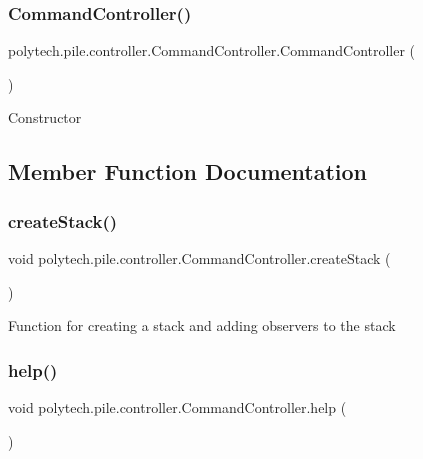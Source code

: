 \subsubsection{\texorpdfstring{Command\+Controller()}{CommandController()}}
{\footnotesize\ttfamily polytech.\+pile.\+controller.\+Command\+Controller.\+Command\+Controller (\begin{DoxyParamCaption}{ }\end{DoxyParamCaption})}

Constructor 

\subsection{Member Function Documentation}
\hypertarget{classpolytech_1_1pile_1_1controller_1_1_command_controller_a8325e47840b45543564efa453d77d4b0}{}\label{classpolytech_1_1pile_1_1controller_1_1_command_controller_a8325e47840b45543564efa453d77d4b0} 
\subsubsection{\texorpdfstring{create\+Stack()}{createStack()}}
{\footnotesize\ttfamily void polytech.\+pile.\+controller.\+Command\+Controller.\+create\+Stack (\begin{DoxyParamCaption}{ }\end{DoxyParamCaption})}

Function for creating a stack and adding observers to the stack \hypertarget{classpolytech_1_1pile_1_1controller_1_1_command_controller_adfc3719a4a015a6d19debda1db443d46}{}\label{classpolytech_1_1pile_1_1controller_1_1_command_controller_adfc3719a4a015a6d19debda1db443d46} 
\subsubsection{\texorpdfstring{help()}{help()}}
{\footnotesize\ttfamily void polytech.\+pile.\+controller.\+Command\+Controller.\+help (\begin{DoxyParamCaption}{ }\end{DoxyParamCaption})}

